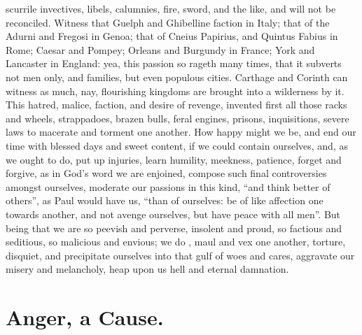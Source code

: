 scurrile invectives, libels, calumnies, fire, sword, and the like, and will not
be reconciled. Witness that Guelph and Ghibelline faction in Italy; that of the
Adurni and Fregosi in Genoa; that of Cneius Papirius, and Quintus Fabius in
Rome; Caesar and Pompey; Orleans and Burgundy in France; York and Lancaster in
England: yea, this passion so rageth many times, that it
subverts not men only, and families, but even populous cities.
Carthage and Corinth can witness as much, nay, flourishing
kingdoms are brought into a wilderness by it. This hatred, malice, faction, and
desire of revenge, invented first all those racks and wheels, strappadoes,
brazen bulls, feral engines, prisons, inquisitions, severe laws to macerate and
torment one another. How happy might we be, and end our time with blessed days
and sweet content, if we could contain ourselves, and, as we ought to do, put
up injuries, learn humility, meekness, patience, forget and forgive, as in
God's word we are enjoined, compose such final
controversies amongst ourselves, moderate our passions in this kind, \enquote{and think
better of others}, as Paul would have us, \enquote{than of
ourselves: be of like affection one towards another, and not avenge ourselves,
but have peace with all men}. But being that we are so peevish and perverse,
insolent and proud, so factious and seditious, so malicious and envious; we do
, maul and vex one another, torture, disquiet, and
precipitate ourselves into that gulf of woes and cares, aggravate our misery
and melancholy, heap upon us hell and eternal damnation.

\section{Anger, a Cause.}

